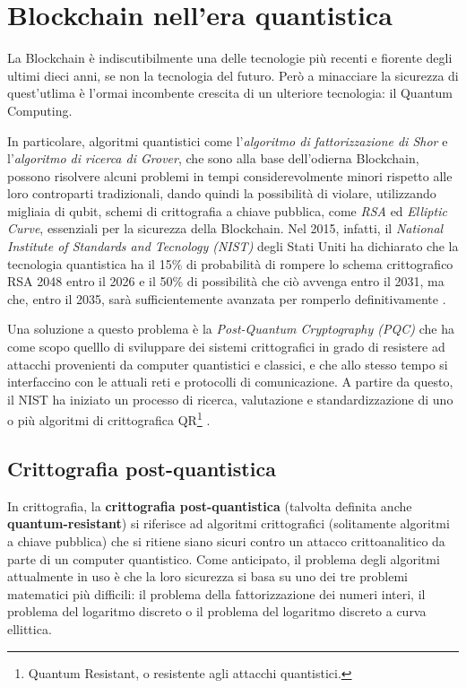 \chapter{Blockchain nell'era quantistica}
La Blockchain è indiscutibilmente una delle tecnologie più recenti e fiorente degli ultimi dieci anni, se non la tecnologia del futuro. Però a minacciare la sicurezza di quest'utlima è l'ormai incombente crescita di un ulteriore tecnologia: il Quantum Computing.

In particolare, algoritmi quantistici come l'\textit{algoritmo di fattorizzazione di Shor} e l'\textit{algoritmo di ricerca di Grover}, che sono alla base dell'odierna Blockchain, possono risolvere alcuni problemi in tempi considerevolmente minori rispetto alle loro controparti tradizionali, dando quindi la possibilità di violare, utilizzando migliaia di qubit, schemi di crittografia a chiave pubblica, come \textit{RSA} ed \textit{Elliptic Curve}, essenziali per la sicurezza della Blockchain. Nel 2015, infatti, il \textit{National Institute of Standards and Tecnology (NIST)} degli Stati Uniti ha dichiarato che la tecnologia quantistica ha il 15\% di probabilità di rompere lo schema crittografico RSA 2048 entro il 2026 e il 50\% di possibilità che ciò avvenga entro il 2031, ma che, entro il 2035, sarà sufficientemente avanzata per romperlo definitivamente \cite{mosca2018cybersecurity}.

Una soluzione a questo problema è la \textit{Post-Quantum Cryptography (PQC)} che ha come scopo quelllo di sviluppare dei sistemi crittografici in grado di resistere ad attacchi provenienti da computer quantistici e classici, e che allo stesso tempo si interfaccino con le attuali reti e protocolli di comunicazione. A partire da questo, il NIST ha iniziato un processo di ricerca, valutazione e standardizzazione di uno o più algoritmi di crittografica QR\footnote{Quantum Resistant, o resistente agli attacchi quantistici.} \cite{quantum_NIST}.

\section{Crittografia post-quantistica}
In crittografia, la \textbf{crittografia post-quantistica} (talvolta definita anche \textbf{quantum-resistant}) si riferisce ad algoritmi crittografici (solitamente algoritmi a chiave pubblica) che si ritiene siano sicuri contro un attacco crittoanalitico da parte di un computer quantistico. Come anticipato, il problema degli algoritmi attualmente in uso è che la loro sicurezza si basa su uno dei tre problemi matematici più difficili: il problema della fattorizzazione dei numeri interi, il problema del logaritmo discreto o il problema del logaritmo discreto a curva ellittica.

